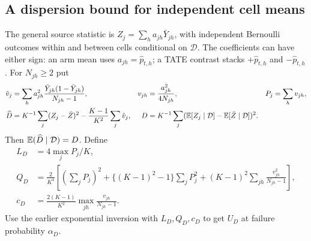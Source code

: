 \subsection{A dispersion bound for independent cell means}

The general source statistic is $Z_j=\sum_h a_{jh}\bar Y_{jh}$, with independent
Bernoulli outcomes within and between cells conditional on $\mathcal D$.
The coefficients can have either sign: an arm mean uses $a_{jh}=\hat p_{t,h}$;
a TATE contrast stacks $+\hat p_{t,h}$ and $-\hat p_{t,h}$.
For $N_{jh}\ge2$ put
\begin{align*}
 \hat v_j&=\sum_h a_{jh}^2
       \frac{\bar Y_{jh}(1-\bar Y_{jh})}{N_{jh}-1},&
 v_{jh}&=\frac{a_{jh}^2}{4N_{jh}},& P_j&=\sum_hv_{jh},\\
 \widehat D&=K^{-1}\sum_j(Z_j-\bar Z)^2
                 -\frac{K-1}{K^2}\sum_j\hat v_j,&
 D&=K^{-1}\sum_j(\mathbb E[Z_j\mid\mathcal D]-\mathbb E[\bar Z\mid\mathcal D])^2.
\end{align*}
Then $\mathbb E(\widehat D\mid\mathcal D)=D$. Define
\begin{align*}
 L_D&=4\max_jP_j/K,\\
 Q_D&=\frac2{K^4}\left[(\sum_jP_j)^2+
       \{(K-1)^2-1\}\sum_jP_j^2+
       (K-1)^2\sum_{jh}\frac{v_{jh}^2}{N_{jh}-1}\right],\\
 c_D&=\frac{2(K-1)}{K^2}\max_{jh}\frac{v_{jh}}{N_{jh}-1}.
\end{align*}
Use the earlier exponential inversion with $L_D,Q_D,c_D$ to get $U_D$ at
failure probability $\alpha_D$.

